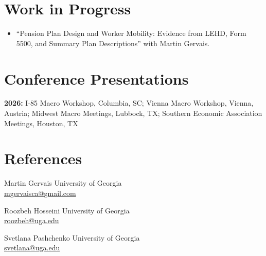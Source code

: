 \documentclass[11pt,a4paper]{article}
\begin{document}
	\section{Work in Progress}
	
	\begin{itemize}
		\item[1.] ``Pension Plan Design and Worker Mobility: Evidence from LEHD, Form 5500, and Summary Plan Descriptions'' with Martin Gervais.
	\end{itemize}
	
	
	\section{Conference Presentations}
	
	\textbf{2026:} I-85 Macro Workshop, Columbia, SC; Vienna Macro Workshop, Vienna, Austria; Midwest Macro Meetings, Lubbock, TX; Southern Economic Association Meetings, Houston, TX
	
	\section{References}
	Martin Gervais \hfill University of Georgia \\
	\href{mailto:mgervaisca@gmail.com}{mgervaisca@gmail.com} 
	
	Roozbeh Hosseini \hfill University of Georgia \\
	\href{mailto:roozbeh@uga.edu}{roozbeh@uga.edu} 
	
	Svetlana Pashchenko \hfill University of Georgia \\
	\href{mailto:svetlana@uga.edu}{svetlana@uga.edu}
	
\end{document}
